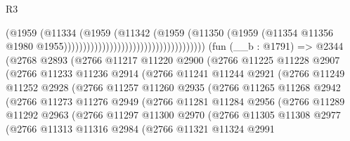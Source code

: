 \begin{lexlean}{R3}
\begin{coremodule}
                                                              (@1959
                                                                (@11334
                                                                  (@1959
                                                                    (@11342
                                                                      (@1959
                                                                        (@11350
                                                                          (@1959
                                                                            (@11354
                                                                              @11356
                                                                              @1980
                                                                              @1955)))))))))))))))))))))))))))))))))))))
    (fun (__b : @1791) =>
    @2344
      (@2768
        @2893
        (@2766
          @11217
          @11220
          @2900
          (@2766
            @11225
            @11228
            @2907
            (@2766
              @11233
              @11236
              @2914
              (@2766
                @11241
                @11244
                @2921
                (@2766
                  @11249
                  @11252
                  @2928
                  (@2766
                    @11257
                    @11260
                    @2935
                    (@2766
                      @11265
                      @11268
                      @2942
                      (@2766
                        @11273
                        @11276
                        @2949
                        (@2766
                          @11281
                          @11284
                          @2956
                          (@2766
                            @11289
                            @11292
                            @2963
                            (@2766
                              @11297
                              @11300
                              @2970
                              (@2766
                                @11305
                                @11308
                                @2977
                                (@2766
                                  @11313
                                  @11316
                                  @2984
                                  (@2766
                                    @11321
                                    @11324
                                    @2991

\end{coremodule}
\end{lexlean}
